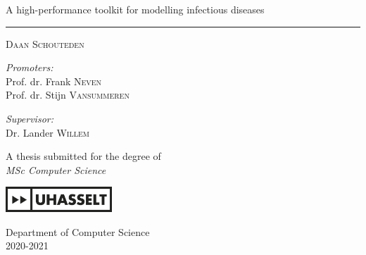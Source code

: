 \begin{titlepage}
\begin{center}
\vspace*{1.8cm}
\Huge {A high-performance toolkit for modelling infectious diseases} \\
\vspace*{1cm}

\begin{center}
\rule{\textwidth}{0.01cm}
\end{center}

\textsc{\Large{Daan}} \textsc{\LARGE{Schouteden}}
\vspace*{3cm}

\noindent
\begin{minipage}{0.45\textwidth}
	\begin{flushleft} \large
	\emph{Promoters:}\\
    Prof. dr. Frank \textsc{Neven}\\
    \vspace*{.1cm}
    Prof. dr. Stijn \textsc{Vansummeren}
	\end{flushleft}
	\end{minipage}%
\begin{minipage}{0.45\textwidth}
	\begin{flushright} \large
	\emph{Supervisor:} \\
    Dr. Lander \textsc{Willem}
	\end{flushright}
\end{minipage}

\vspace*{3cm}
\large A thesis submitted for the degree of\\  \textit{MSc Computer Science}\\ [0.8cm]
\begin{center}
	\includegraphics[width=0.3\textwidth]{Title/logo_UHasselt.png}
\end{center}	

\vspace*{0.5cm}
\large Department of Computer Science \\ 2020-2021

\end{center}
\end{titlepage}